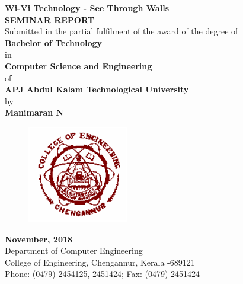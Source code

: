 \documentclass[a4paper,12pt,oneside]{article}
\begin{document}
\thispagestyle{empty}
\begin{center}

\large{\textbf{Wi-Vi Technology - See Through Walls}
\setlength{\baselineskip}{1.5\baselineskip}}
\\

\vspace{5mm}
\textbf{SEMINAR REPORT}
\\
\vspace{3mm}
Submitted in the partial fulfilment of the award of the degree
of
\vspace{3mm}
\\
\textbf{Bachelor of Technology}
\\
\vspace{3mm}
in
\\
\vspace{3mm}
\textbf{Computer Science and Engineering}
\\
\vspace{3mm}
of
\\
\vspace{3mm}
\textbf{APJ Abdul Kalam Technological University}
\\
\vspace{3mm}
by
\\
\vspace{3mm}
\textbf{Manimaran N}
\\
\vspace{5mm}
\begin{figure}[H]
	\centering
	\includegraphics{ceclogo.png}
\end{figure}
\vspace{25mm}
\textbf{November, 2018}
\vspace{8mm}
\\
\vspace{2mm}
Department of Computer Engineering
\\
\vspace{2mm}
College of Engineering, Chengannur, Kerala -689121
\\
\vspace{2mm}
Phone: (0479) 2454125, 2451424; Fax: (0479) 2451424
\\


\end{center}
\end{document}
